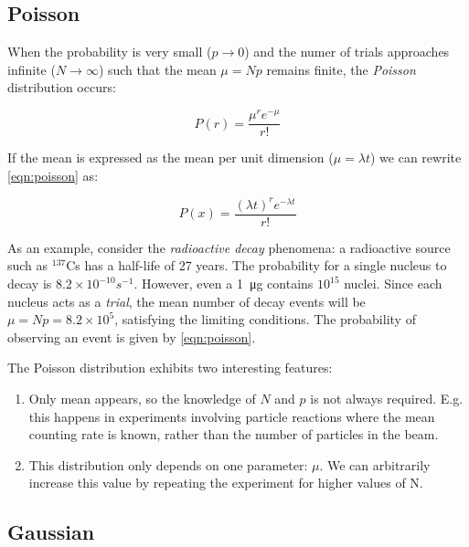 \subsection{Poisson}

When the probability is very small ($p \rightarrow 0$) and the numer of trials approaches infinite ($N \rightarrow \infty$) such that the mean $\mu = N p$ remains finite, the \textit{Poisson} distribution occurs:


\begin{equation}
	\label{eqn:poisson}
	P\left( r \right) = \frac{{\mu^{ r } e ^{-\mu} }}{{r!}}
\end{equation}

If the mean is expressed as the mean per unit dimension ($\mu = \lambda t$) we can rewrite \ref{eqn:poisson} as:

\begin{equation}
	P\left( x \right) = \frac{(\lambda t) ^r {e^{ - \lambda t}} }{{r!}}
\end{equation}


As an example, consider the \textit{radioactive decay} phenomena: a radioactive source such as $^{137}$Cs has a half-life of 27 years. The probability for a single nucleus to decay is $8.2 \times 10^{-10}s^{-1}$. However, even a \SI{1}{\micro\gram} contains $10^{15}$ nuclei. Since each nucleus acts as a \textit{trial}, the mean number of decay events will be $\mu = N p = 8.2 \times 10^5$, satisfying the limiting conditions. The probability of observing an event is given by \ref{eqn:poisson}.

The Poisson distribution exhibits two interesting features:

\begin{enumerate}
	\item Only mean appears, so the knowledge of $N$ and $p$ is not always required. E.g. this happens in experiments involving particle reactions where the mean counting rate is known, rather than the number of particles in the beam.

	\item This distribution only depends on one parameter: $\mu$. We can arbitrarily increase this value by repeating the experiment for higher values of N.
\end{enumerate}

\subsection{Gaussian}

